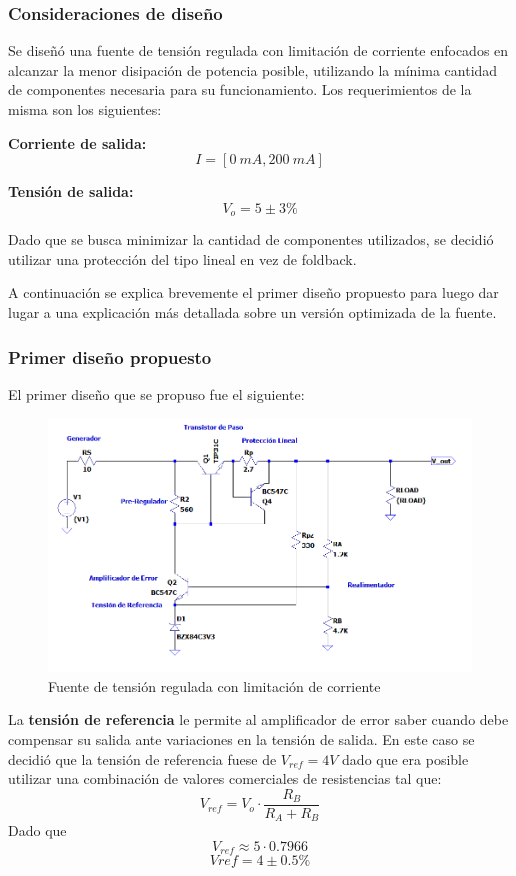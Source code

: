 \subsubsection{Consideraciones de diseño}
Se diseñó una fuente de tensión regulada con limitación de corriente enfocados en alcanzar la menor disipación de potencia posible, utilizando la mínima cantidad de componentes necesaria para su funcionamiento. Los requerimientos de la misma son los siguientes:

\textbf{Corriente de salida:}
\begin{equation}
	I = [0\ mA, 200\ mA]
\end{equation}

\textbf{Tensión de salida:}
\begin{equation}
V_{o} = 5 \pm 3\%
\end{equation}

Dado que se busca minimizar la cantidad de componentes utilizados, se decidió utilizar una protección del tipo lineal en vez de foldback.

A continuación se explica brevemente el primer diseño propuesto para luego dar lugar a una explicación más detallada sobre un versión optimizada de la fuente.

\subsubsection{Primer diseño propuesto}
El primer diseño que se propuso fue el siguiente:
\begin{figure}[H]
	\centering
	\includegraphics[width=0.7\linewidth]{ImagenesEjercicio1/ImagenCircuitoFV}
	\caption{Fuente de tensión regulada con limitación de corriente}
	\label{fig:imagencircuito}
\end{figure}

La \textbf{tensión de referencia} le permite al amplificador de error saber cuando debe compensar su salida ante variaciones en la tensión de salida. 
En este caso se decidió que la tensión de referencia fuese de $V_{ref} = 4V$ dado que era posible utilizar una combinación de valores comerciales de resistencias tal que:
\begin{equation}
	V_{ref}  = V_{o} \cdot \frac{R_B}{R_A + R_B}
\end{equation} 
Dado que 
\begin{equation}
	V_{ref} \approx 5 \cdot 0.7966
\end{equation}
\begin{equation}
	V{ref} = 4 \pm 0.5 \%
\end{equation}

